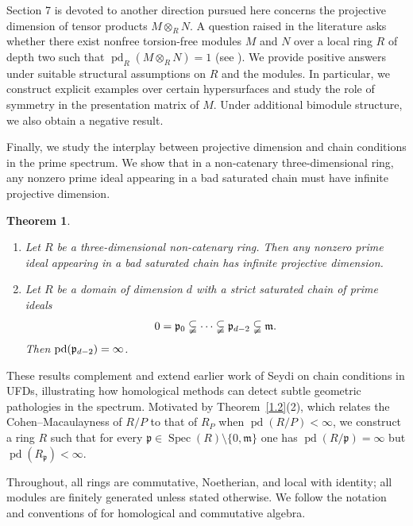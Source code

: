 \documentclass[11.05pt,a4paper]{amsart}
\newtheorem{theorem}{Theorem}[section]
\theoremstyle{definition}
\theoremstyle{remark}
\newcommand{\Spec}{\operatorname{Spec}}
\newcommand{\pd}{\operatorname{pd}}
\newcommand{\fm}{\frak{m}}
\newcommand{\fp}{\frak{p}}
\begin{document}
Section 7 is devoted to another direction pursued here concerns the projective dimension of tensor products \( M \otimes_R N \). A question raised in the literature asks whether there exist nonfree torsion-free modules \( M \) and \( N \) over a local ring \( R \) of depth two such that \( \pd_R(M \otimes_R N) = 1 \) (see \cite[Question 3.3]{celp}). We provide positive answers under suitable structural assumptions on \( R \) and the modules. In particular, we construct explicit examples over certain hypersurfaces and study the role of symmetry in the presentation matrix of \( M \). Under additional bimodule structure, we also obtain a negative result.

Finally, we study the interplay between projective dimension and chain conditions in the prime spectrum. We show that in a non-catenary three-dimensional ring, any nonzero prime ideal appearing in a bad saturated chain must have infinite projective dimension.

\begin{theorem}\label{1.8}
	\begin{enumerate}
		\item
		Let \( R \) be a three-dimensional non-catenary ring. Then any nonzero prime ideal appearing in a bad saturated chain has infinite projective dimension.
		
		\item
		Let \( R \) be a domain of dimension \( d \) with a strict saturated chain of prime ideals
		\[
		0=\fp_0 \subsetneqq \cdots \subsetneqq \fp_{d-2}\subsetneqq\fm.
		\]
		Then \( \pd(\fp_{d-2}) = \infty \).
	\end{enumerate}
\end{theorem}

These results complement and extend earlier work of Seydi \cite[Proposition II.3]{S} on chain conditions in UFDs, illustrating how homological methods can detect subtle geometric pathologies in the spectrum.
Motivated by Theorem~\ref{1.2}(2), which relates the Cohen--Macaulayness of \( R/P \) to that of \( R_P \) when \( \pd(R/P) < \infty \), we construct a ring \( R \) such that for every \( \mathfrak{p} \in \Spec(R)\setminus\{0,\mathfrak{m}\} \) one has \( \pd(R/\mathfrak{p}) = \infty \) but \( \pd(R_{\mathfrak{p}}) < \infty \).

Throughout, all rings are commutative, Noetherian, and local with identity; all modules are finitely generated unless stated otherwise. We follow the notation and conventions of \cite{BH,mat} for homological and commutative algebra.
\end{document}
